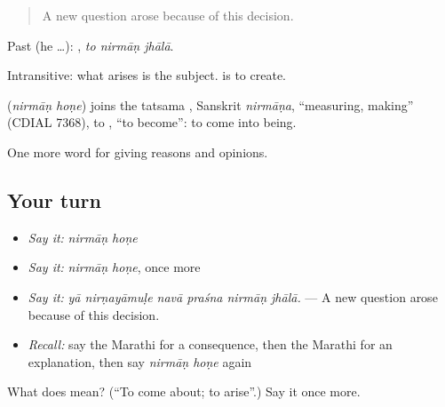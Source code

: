 \begin{quote}
A new question arose because of this decision.
\end{quote}

Past (he …):   , \emph{to nirmāṇ jhālā}.

Intransitive: what arises is the subject.   is to create.

\begin{cousinweb}
\textbf{ } (\emph{nirmāṇ hoṇe}) joins the tatsama , Sanskrit \emph{nirmāṇa}, \textquotedblleft{}measuring, making\textquotedblright{} (CDIAL 7368), to , \textquotedblleft{}to become\textquotedblright{}: to come into being.
\end{cousinweb}

\begin{grammarlens}[title={What you've built}]
One more word for giving reasons and opinions.
\end{grammarlens}

\subsection*{Your turn}
\begin{itemize}
\raggedright
  \item \emph{Say it:} \emph{nirmāṇ hoṇe}
  \item \emph{Say it:} \emph{nirmāṇ hoṇe}, once more
  \item \emph{Say it:} \emph{yā nirṇayāmuḷe navā praśna nirmāṇ jhālā.} — A new question arose because of this decision.
  \item \emph{Recall:} say the Marathi for a consequence, then the Marathi for an explanation, then say \emph{nirmāṇ hoṇe} again
\end{itemize}

\begin{tcolorbox}[breakable,colback=teal!4,colframe=teal!35!black,title={Before you move on}]
What does   mean? (\textquotedblleft{}To come about; to arise\textquotedblright{}.) Say it once more.
\end{tcolorbox}
